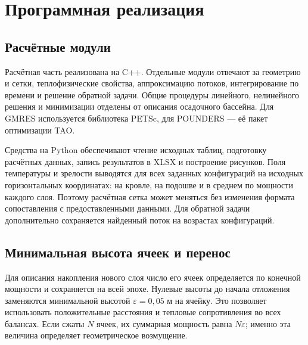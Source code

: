 \section{Программная реализация}
\label{sec:implementation}

\subsection{Расчётные модули}

Расчётная часть реализована на C++. Отдельные модули отвечают
за геометрию и сетки, теплофизические свойства, аппроксимацию потоков,
интегрирование по времени и решение обратной задачи. Общие процедуры
линейного, нелинейного решения и минимизации отделены от описания
осадочного бассейна. Для GMRES используется библиотека PETSc,
для POUNDERS --- её пакет оптимизации TAO.

Средства на Python обеспечивают чтение исходных таблиц, подготовку
расчётных данных, запись результатов в XLSX и построение рисунков.
Поля температуры и зрелости выводятся для всех заданных конфигураций
на исходных горизонтальных координатах: на кровле, на подошве
и в среднем по мощности каждого слоя. Поэтому расчётная сетка может
меняться без изменения формата сопоставления с предоставленными
данными. Для обратной задачи дополнительно сохраняется найденный
поток на возрастах конфигураций.

\subsection{Минимальная высота ячеек и перенос}

Для описания накопления нового слоя число его ячеек определяется
по конечной мощности и сохраняется на всей эпохе. Нулевые высоты
до начала отложения заменяются минимальной высотой
$\varepsilon=0{,}05$ м на ячейку. Это позволяет использовать
положительные расстояния и тепловые сопротивления во всех балансах.
Если сжаты $N$ ячеек, их суммарная мощность равна $N\varepsilon$;
именно эта величина определяет геометрическое возмущение.

